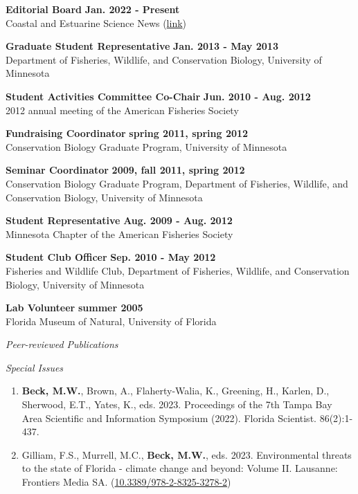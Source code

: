 \documentclass[letterpaper,12pt]{article}
\newcommand{\sectitle}[1]{\vspace{\baselineskip} \centerline{\large{\textit{#1}}}}
\newcommand{\subsectitle}[1]{\vspace{\baselineskip} \centerline{\normalsize{\textit{#1}}}}
\begin{document}
{\bf Editorial Board} \hfill {\bf Jan. 2022 - Present} \\
Coastal and Estuarine Science News (\href{https://www.cerf.science/cesn}{link})

{\bf Graduate Student Representative} \hfill {\bf Jan. 2013 - May 2013} \\
Department of Fisheries, Wildlife, and Conservation Biology, University of Minnesota

{\bf Student Activities Committee Co-Chair} \hfill {\bf Jun. 2010 - Aug. 2012} \\
2012 annual meeting of the American Fisheries Society

{\bf Fundraising Coordinator} \hfill {\bf spring 2011, spring 2012} \\
Conservation Biology Graduate Program, University of Minnesota

{\bf Seminar Coordinator} \hfill {\bf 2009, fall 2011, spring 2012} \\
Conservation Biology Graduate Program, Department of Fisheries, Wildlife, and Conservation Biology, University of Minnesota

{\bf Student Representative} \hfill {\bf Aug. 2009 - Aug. 2012} \\
Minnesota Chapter of the American Fisheries Society

{\bf Student Club Officer} \hfill {\bf Sep. 2010 - May 2012} \\
Fisheries and Wildlife Club, Department of Fisheries, Wildlife, and Conservation Biology, University of Minnesota 

{\bf Lab Volunteer} \hfill {\bf summer 2005} \\
Florida Museum of Natural, University of Florida

\sectitle{Peer-reviewed Publications}

\subsectitle{Special Issues}

\begin{enumerate}

\item \textbf{Beck, M.W.}, Brown, A., Flaherty-Walia, K., Greening, H., Karlen, D., Sherwood, E.T., Yates, K., eds. 2023. Proceedings of the 7th Tampa Bay Area Scientific and Information Symposium (2022). Florida Scientist. 86(2):1-437.

\item Gilliam, F.S., Murrell, M.C., \textbf{Beck, M.W.}, eds. 2023. Environmental threats to the state of Florida - climate change and beyond: Volume II. Lausanne: Frontiers Media SA. ({\footnotesize\href{https://doi.org/10.3389/978-2-8325-3278-2}{10.3389/978-2-8325-3278-2}}) 

\end{enumerate}
\end{document}
